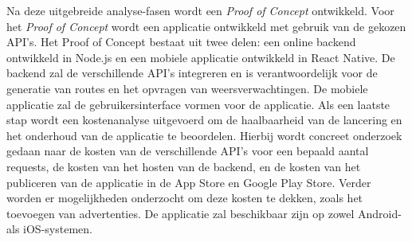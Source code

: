 Na deze uitgebreide analyse-fasen wordt een \emph{Proof of Concept} ontwikkeld.
Voor het \emph{Proof of Concept} wordt een applicatie ontwikkeld met gebruik van de gekozen API's.
Het Proof of Concept bestaat uit twee delen: een online backend ontwikkeld in Node.js
en een mobiele applicatie ontwikkeld in React Native. 
De backend zal de verschillende API's integreren en is verantwoordelijk voor 
de generatie van routes en het opvragen van weersverwachtingen.
De mobiele applicatie zal de gebruikersinterface vormen voor de applicatie.
Als een laatste stap wordt een kostenanalyse uitgevoerd om de haalbaarheid van de lancering en het onderhoud van de applicatie te beoordelen.
Hierbij wordt concreet onderzoek gedaan naar de kosten van de verschillende API's voor een bepaald aantal requests, 
de kosten van het hosten van de backend, en de kosten van het publiceren van de applicatie in de App Store en Google Play Store.
Verder worden er mogelijkheden onderzocht om deze kosten te dekken, zoals het toevoegen van advertenties.
De applicatie zal beschikbaar zijn op zowel Android- als iOS-systemen.

